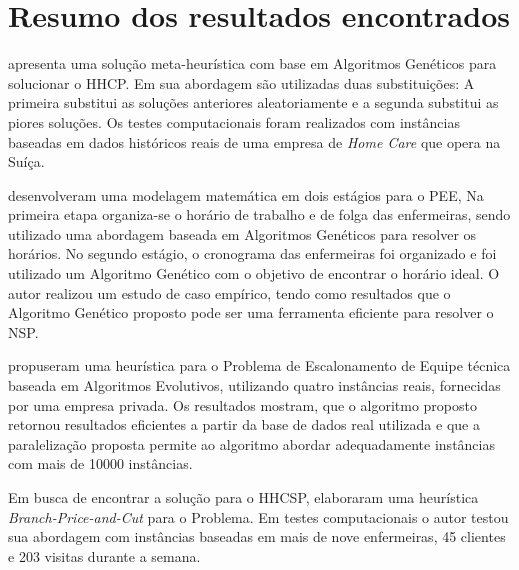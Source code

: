 \section{Resumo dos resultados encontrados}


\cite{nguyen:2016} apresenta uma solução meta-heurística com base em Algoritmos Genéticos para solucionar o \ac{HHCP}. Em sua abordagem são utilizadas duas substituições: A primeira substitui as soluções anteriores aleatoriamente e a segunda substitui as piores soluções. Os testes computacionais foram realizados com instâncias baseadas em dados históricos reais de uma empresa de \textit{Home Care} que opera na Suíça.



\cite{tsai:2009} desenvolveram uma modelagem matemática em dois estágios para o \ac{PEE}, Na primeira etapa organiza-se o horário de trabalho e de folga das enfermeiras,  sendo utilizado uma abordagem baseada em Algoritmos Genéticos para resolver os horários. No segundo estágio, o cronograma das enfermeiras foi organizado e foi utilizado um  Algoritmo Genético com o objetivo de encontrar o horário ideal. O autor realizou um estudo de caso empírico, tendo como resultados que o Algoritmo Genético proposto pode ser uma ferramenta eficiente para resolver o \ac{NSP}.

 \cite{luna:2013} propuseram uma heurística para o Problema de Escalonamento de Equipe técnica baseada em Algoritmos Evolutivos, utilizando quatro instâncias reais, fornecidas por uma empresa privada. Os resultados mostram,  que o algoritmo proposto retornou resultados eficientes a partir da base de dados real utilizada e  que a paralelização proposta permite ao algoritmo abordar adequadamente instâncias com mais de 10000 instâncias. 

Em busca de encontrar a solução para o \ac{HHCSP}, \cite{trautsamwieser:2014} elaboraram uma heurística  \textit{Branch-Price-and-Cut} para o Problema. Em testes computacionais o autor testou sua abordagem com instâncias baseadas em mais de nove enfermeiras, 45 clientes e 203 visitas durante a semana.

